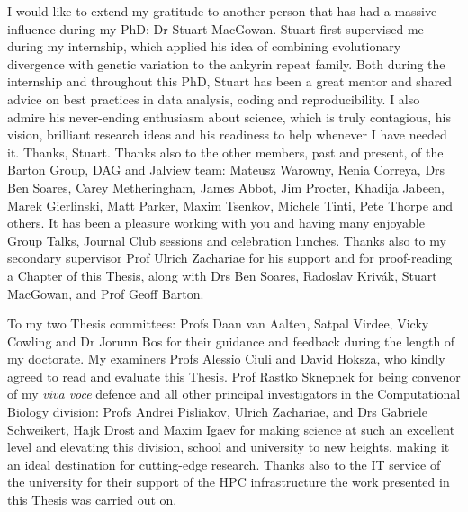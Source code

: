 I would like to extend my gratitude to another person that has had a massive influence during my PhD: Dr Stuart MacGowan. Stuart first supervised me during my internship, which applied his idea of combining evolutionary divergence with genetic variation to the ankyrin repeat family. Both during the internship and throughout this PhD, Stuart has been a great mentor and shared advice on best practices in data analysis, coding and reproducibility. I also admire his never-ending enthusiasm about science, which is truly contagious, his vision, brilliant research ideas and his readiness to help whenever I have needed it. Thanks, Stuart. Thanks also to the other members, past and present, of the Barton Group, DAG and Jalview team: Mateusz Warowny, Renia Correya, Drs Ben Soares, Carey Metheringham, James Abbot, Jim Procter, Khadija Jabeen, Marek Gierlinski, Matt Parker, Maxim Tsenkov, Michele Tinti, Pete Thorpe and others. It has been a pleasure working with you and having many enjoyable Group Talks, Journal Club sessions and celebration lunches. Thanks also to my secondary supervisor Prof Ulrich Zachariae for his support and for proof-reading a Chapter of this Thesis, along with Drs Ben Soares, Radoslav Krivák, Stuart MacGowan, and Prof Geoff Barton.

To my two Thesis committees: Profs Daan van Aalten, Satpal Virdee, Vicky Cowling and Dr Jorunn Bos for their guidance and feedback during the length of my doctorate. My examiners Profs Alessio Ciuli and David Hoksza, who kindly agreed to read and evaluate this Thesis. Prof Rastko Sknepnek for being convenor of my \textit{viva voce} defence and all other principal investigators in the Computational Biology division: Profs Andrei Pisliakov, Ulrich Zachariae, and Drs Gabriele Schweikert, Hajk Drost and Maxim Igaev for making science at such an excellent level and elevating this division, school and university to new heights, making it an ideal destination for cutting-edge research. Thanks also to the IT service of the university for their support of the HPC infrastructure the work presented in this Thesis was carried out on.


